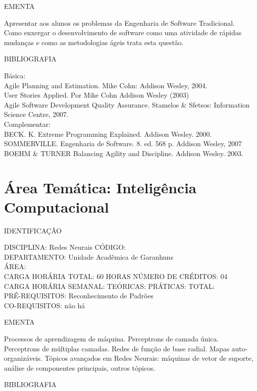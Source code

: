 \documentclass[
	12pt,				%
	openright,			%
  oneside,     %
	a4paper,			%
	chapter=TITLE,		%
	english,			%
	french,				%
	spanish,			%
	brazil				%
	]{abntex2}
\begin{document}
\begin{apendicesenv}
EMENTA 

Apresentar aos alunos os problemas da Engenharia de Software
Tradicional. Como enxergar o desenvolvimento de software como uma
atividade de rápidas mudanças e como as metodologias ágeis trata esta
questão.

BIBLIOGRAFIA 

Básica:\\
Agile Planning and Estimation. Mike Cohn: Addison Wesley, 2004.\\
User Stories Applied. Por Mike Cohn  Addison Wesley (2003)\\
Agile Software Development Quality Assurance. Stamelos \& Sfetsos:
Information Science Centre, 2007.\\
Complementar:\\
BECK. K. Extreme Programming Explained. Addison Wesley. 2000.\\
SOMMERVILLE. Engenharia de Software. 8. ed. 568 p. Addison Wesley, 2007\\
BOEHM \& TURNER Balancing Agility and Discipline. Addison Wesley. 2003.
\newpage 

\section*{Área Temática: Inteligência Computacional}

IDENTIFICAÇÃO

DISCIPLINA: Redes Neurais CÓDIGO:\\ 
DEPARTAMENTO: Unidade Acadêmica de Garanhuns\\
ÁREA: \\
CARGA HORÁRIA TOTAL: 60 HORAS NÚMERO DE CRÉDITOS: 04\\
CARGA HORÁRIA SEMANAL: TEÓRICAS: PRÁTICAS: TOTAL: \\
PRÉ-REQUISITOS: Reconhecimento de Padrões\\
CO-REQUISITOS: não há

EMENTA 

Processos de aprendizagem de máquina. Perceptrons de camada única.
Perceptrons de múltiplas camadas. Redes de função de base radial. Mapas
auto-organizáveis. Tópicos avançados em Redes Neurais: máquinas de
vetor de suporte, análise de componentes principais, outros tópicos.

BIBLIOGRAFIA 


\end{apendicesenv}
\end{document}

